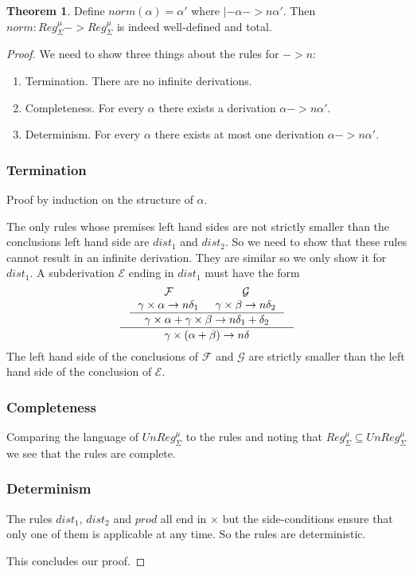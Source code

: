 \documentclass[a4paper, oneside]{memoir}
\theoremstyle{definition}
\newtheorem{theorem}{Theorem}
\begin{document}
\begin{theorem}
  Define $norm(\alpha) = \alpha'$ where $|- \alpha ->n \alpha'$. Then $norm :
  Reg_{\Sigma}^{\mu} -> Reg_{\Sigma}^{\mu}$ is indeed well-defined and total.

  \begin{proof}
    We need to show three things about the rules for $->n$:
    \begin{enumerate}
    \item Termination. There are no infinite derivations.
    \item Completeness. For every $\alpha$ there exists a derivation $\alpha ->n
      \alpha'$.
    \item Determinism. For every $\alpha$ there exists at most one derivation
      $\alpha ->n \alpha'$.
    \end{enumerate}
    \subsubsection{Termination}
    Proof by induction on the structure of $\alpha$.

    The only rules whose premises left hand sides are not strictly smaller than
    the conclusions left hand side are $dist_1$ and $dist_2$. So we need to show
    that these rules cannot result in an infinite derivation. They are similar
    so we only show it for $dist_1$. A subderivation $\mathcal{E}$ ending in
    $dist_1$ must have the form
    \[
    \inference{\inference{\mathcal{F} & \mathcal{G} \\ \gamma \times \alpha ->n
        \delta_1 & \gamma \times \beta ->n \delta_2 }{\gamma \times \alpha +
        \gamma \times \beta ->n \delta_1 + \delta_2}}{\gamma \times (\alpha +
      \beta) ->n \delta}
    \]
    The left hand side of the conclusions of $\mathcal{F}$ and $\mathcal{G}$ are
    strictly smaller than the left hand side of the conclusion of $\mathcal{E}$.

    \subsubsection{Completeness}
    Comparing the language of $UnReg_{\Sigma}^{\mu}$ to the rules and noting
    that $Reg_{\Sigma}^{\mu} \subseteq UnReg_{\Sigma}^{\mu}$ we see that the rules
    are complete.

    \subsubsection{Determinism}
    The rules $dist_1$, $dist_2$ and $prod$ all end in $\times$ but the
    side-conditions ensure that only one of them is applicable at any time. So
    the rules are deterministic.

    This concludes our proof.
  \end{proof}
\end{theorem}
\end{document}
